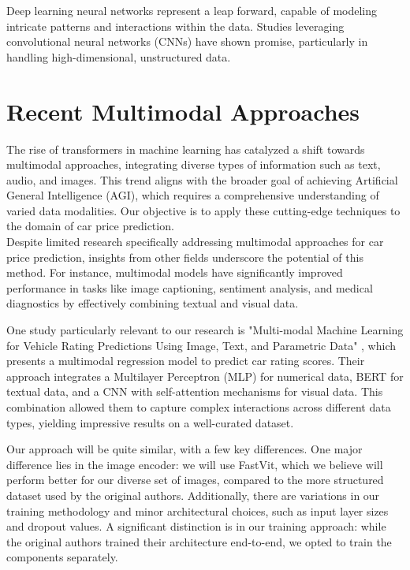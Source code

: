 Deep learning neural networks represent a leap forward, capable of modeling intricate patterns and interactions within the data. Studies leveraging convolutional neural networks (CNNs) have shown promise, particularly in handling high-dimensional, unstructured data.

\section{Recent Multimodal Approaches}
The rise of transformers in machine learning has catalyzed a shift towards multimodal approaches, integrating diverse types of information such as text, audio, and images. This trend aligns with the broader goal of achieving Artificial General Intelligence (AGI), which requires a comprehensive understanding of varied data modalities. Our objective is to apply these cutting-edge techniques to the domain of car price prediction.
\\

Despite limited research specifically addressing multimodal approaches for car price prediction, insights from other fields underscore the potential of this method. For instance, multimodal models have significantly improved performance in tasks like image captioning, sentiment analysis, and medical diagnostics by effectively combining textual and visual data.

One study particularly relevant to our research is "Multi-modal Machine Learning for Vehicle Rating Predictions Using Image, Text, and Parametric Data" \cite{su2023multi}, which presents a multimodal regression model to predict car rating scores. Their approach integrates a Multilayer Perceptron (MLP) for numerical data, BERT for textual data, and a CNN with self-attention mechanisms for visual data. This combination allowed them to capture complex interactions across different data types, yielding impressive results on a well-curated dataset. 

Our approach will be quite similar, with a few key differences. One major difference lies in the image encoder: we will use FastVit, which we believe will perform better for our diverse set of images, compared to the more structured dataset used by the original authors. Additionally, there are variations in our training methodology and minor architectural choices, such as input layer sizes and dropout values. A significant distinction is in our training approach: while the original authors trained their architecture end-to-end, we opted to train the components separately.
